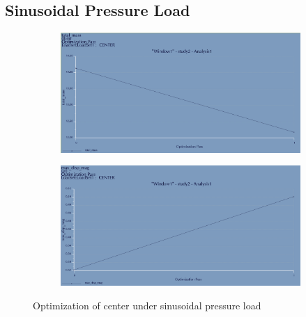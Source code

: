 \documentclass[12pt,letterpaper]{report}
\begin{document}
		\subsection{Sinusoidal Pressure Load}
		\graphicspath{ {./ScreenShots/Sinusoidal/} }
		\begin{figure}[H]
			\centering
			\begin{subfigure}{.45\textwidth}
				\includegraphics[width=\textwidth]{SinusoidalCenterOptimDisp}
				\label{fig:CenterSinusoidalOptimDispGraph}
			\end{subfigure}
			\begin{subfigure}{.45\textwidth}
				\includegraphics[width=\textwidth]{SinusoidalCenterOptimMass}
				\label{fig:CenterSinusoidalOptimMassGraph}
			\end{subfigure}
			\caption{Optimization of center under sinusoidal pressure load}
		\end{figure}
		
\end{document}
